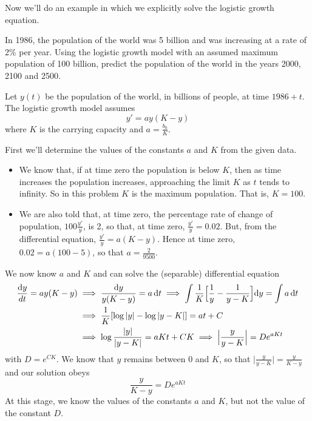 \noindent Now we'll do an example in which we explicitly solve the logistic
growth equation.

\begin{eg}\label{eg:SDElogisticA}
 In 1986, the population of the world was 5 billion and was
increasing at a rate of 2\% per year. Using the logistic growth model
with an assumed maximum population of 100 billion, predict the population
of the world in the years 2000, 2100 and 2500.


\soln Let $y(t)$ be the population of the world, in billions of people,
at time $1986+t$. The logistic growth model assumes
\begin{equation*}
y'=ay(K-y)
\end{equation*}
where $K$ is the carrying capacity and $a=\frac{b_0}{K}$.

First we'll determine the values of the constants $a$ and $K$ from the
given data.
\begin{itemize}\itemsep1pt \parskip0pt  %
\item
We know  that, if at time zero the population is below $K$, then as time
increases the population increases, approaching the limit $K$ as $t$ tends
to infinity. So in this problem $K$ is the maximum population. That is,
$K=100$.
\item
 We are also told that, at time zero, the percentage rate of change
of population, $100\frac{y'}{y}$, is 2, so that, at time zero,
$\frac{y'}{y}=0.02$.
But, from the differential equation, $\frac{y'}{y}=a(K-y)$. Hence at time
zero, $0.02=a(100-5)$, so that $a= \frac{2}{9500}$.
\end{itemize}
We now know $a$ and $K$ and can solve the (separable) differential equation
\begin{align*}
\frac{\mathrm{d}y}{dt}=ay(K-y)&\implies
\frac{\mathrm{d}y}{y(K-y)}=a\,\mathrm{d}t\implies
\int\frac{1}{K}\Big[\frac{1}{y}-\frac{1}{y-K}\Big]\mathrm{d}y=\int a\,\mathrm{d}t\\
&\implies \frac{1}{K}[\log |y|-\log|y-K|]=at+C \\
&\implies  \log\frac{|y|}{|y-K|}=aKt+CK\implies
\Big|\frac{y}{y-K}\Big|=De^{aKt}
\end{align*}
with $D=e^{CK}$. We know that $y$ remains between $0$ and $K$, so that
$\Big|\frac{y}{y-K}\Big|=\frac{y}{K-y}$ and our solution obeys
\begin{equation*}
\frac{y}{K-y}=De^{aKt}
\end{equation*}
At this stage, we know the values of the constants $a$ and $K$, but not
the value of the constant $D$.

\end{eg}
